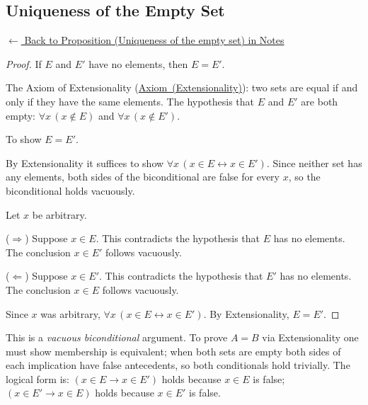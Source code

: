
\subsection*{Uniqueness of the Empty Set}
\label{prf:empty-unique}

\begin{remark*}[Return]
\hyperref[prop:empty-unique]{$\leftarrow$ Back to Proposition (Uniqueness of the empty set) in Notes}
\end{remark*}

\begin{proof}
\Claim If $E$ and $E'$ have no elements, then $E = E'$.

\Given The Axiom of Extensionality (\hyperref[ax:zf-extensionality]{Axiom~(Extensionality)}):
two sets are equal if and only if they have the same elements. The hypothesis
that $E$ and $E'$ are both empty: $\forall x\,(x \notin E)$ and $\forall x\,(x
\notin E')$.

\Goal To show $E = E'$.

\Strategy By Extensionality it suffices to show $\forall x\,(x \in E
\leftrightarrow x \in E')$. Since neither set has any elements, both sides of
the biconditional are false for every $x$, so the biconditional holds vacuously.

Let $x$ be arbitrary.

($\Rightarrow$) Suppose $x \in E$. This contradicts the hypothesis that $E$ has
no elements. The conclusion $x \in E'$ follows vacuously.

($\Leftarrow$) Suppose $x \in E'$. This contradicts the hypothesis that $E'$
has no elements. The conclusion $x \in E$ follows vacuously.

Since $x$ was arbitrary, $\forall x\,(x \in E \leftrightarrow x \in E')$.
By Extensionality, $E = E'$. \AsReq
\end{proof}

\begin{remark*}
This is a \emph{vacuous biconditional} argument. To prove $A = B$ via
Extensionality one must show membership is equivalent; when both sets are empty
both sides of each implication have false antecedents, so both conditionals hold
trivially. The logical form is: $(x \in E \rightarrow x \in E')$ holds because
$x \in E$ is false; $(x \in E' \rightarrow x \in E)$ holds because $x \in E'$
is false.
\end{remark*}

